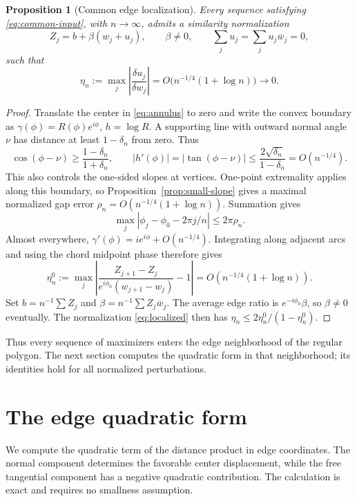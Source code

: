 \documentclass[11pt,reqno]{amsart}
\numberwithin{equation}{section}
\newtheorem{proposition}[theorem]{Proposition}
\theoremstyle{definition}
\theoremstyle{remark}
\newcommand{\dd}{\delta}
\begin{document}
\begin{proposition}[Common edge localization]\label{prop:localization}
Every sequence satisfying \eqref{eq:common-input}, with $n\to\infty$, admits a similarity normalization
\begin{equation}\label{eq:localized}
 Z_j=b+\beta(w_j+u_j),\qquad \beta\ne0,\qquad
 \sum_j u_j=\sum_j u_j\overline w_j=0,
\end{equation}
such that
\begin{equation}\label{eq:eta}
 \eta_n:=\max_j\left|\frac{\dd u_j}{\dd w_j}\right|
 =O\bigl(n^{-1/4}(1+\log n)\bigr)\longrightarrow0.
\end{equation}
\end{proposition}
\begin{proof}
Translate the center in \eqref{eq:annulus} to zero and write the convex boundary as $\gamma(\phi)=R(\phi)e^{i\phi}$, $h=\log R$. A supporting line with outward normal angle $\nu$ has distance at least $1-\delta_n$ from zero. Thus
\[
 \cos(\phi-\nu)\ge\frac{1-\delta_n}{1+\delta_n},\qquad
 |h'(\phi)|=|\tan(\phi-\nu)|\le\frac{2\sqrt{\delta_n}}{1-\delta_n}
 =O(n^{-1/4}).
\]
This also controls the one-sided slopes at vertices. One-point extremality applies along this boundary, so Proposition~\ref{prop:small-slope} gives a maximal normalized gap error $\rho_n=O(n^{-1/4}(1+\log n))$. Summation gives
\[
 \max_j|\phi_j-\phi_0-2\pi j/n|\le2\pi\rho_n.
\]
Almost everywhere, $\gamma'(\phi)=ie^{i\phi}+O(n^{-1/4})$. Integrating along adjacent arcs and using the chord midpoint phase therefore gives
\[
 \eta_n^0:=\max_j\left|
 \frac{Z_{j+1}-Z_j}{e^{i\phi_0}(w_{j+1}-w_j)}-1\right|
 =O(n^{-1/4}(1+\log n)).
\]
Set $b=n^{-1}\sum Z_j$ and $\beta=n^{-1}\sum Z_j\overline w_j$. The average edge ratio is $e^{-i\phi_0}\beta$, so $\beta\ne0$ eventually. The normalization \eqref{eq:localized} then has $\eta_n\le2\eta_n^0/(1-\eta_n^0)$.
\end{proof}

Thus every sequence of maximizers enters the edge neighborhood of the regular polygon. The next section computes the quadratic form in that neighborhood; its identities hold for all normalized perturbations.


\section{The edge quadratic form}\label{sec:normal}
We compute the quadratic term of the distance product in edge coordinates. The normal component determines the favorable center displacement, while the free tangential component has a negative quadratic contribution. The calculation is exact and requires no smallness assumption.
\end{document}
